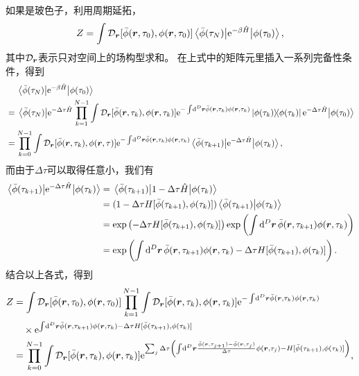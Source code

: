 \documentclass[hyperref, UTF8, a4paper]{ctexart}
\newcommand*{\ee}{\mathrm{e}}
\begin{document}
如果是玻色子，利用周期延拓，
\[
    Z = \int \mathcal{D}_{\vb*{r}}{[\bar{\phi}(\vb*{r}, \tau_0), \phi(\vb*{r}, \tau_0)]} \mel{\bar{\phi}(\tau_N)}{\ee^{- \beta \hat{H}}}{\phi(\tau_0)},
\]
其中$\mathcal{D}_{\vb*{r}}$表示只对空间上的场构型求和。
在上式中的矩阵元里插入一系列完备性条件，得到
\[
    \begin{aligned}
        &\quad \; \mel{\bar{\phi}(\tau_N)}{\ee^{- \beta \hat{H}}}{\phi(\tau_0)} \\
        &= \mel{\bar{\phi}(\tau_N)}{\ee^{-\Delta \tau \hat{H}} \prod_{k=1}^{N-1} \int \mathcal{D}_{\vb*{r}}[\bar{\phi}(\vb*{r}, \tau_k), \phi(\vb*{r}, \tau_k)] \ee^{- \int \dd[D]{\vb*{r}} \bar{\phi}(\vb*{r}, \tau_k) \phi(\vb*{r}, \tau_k) } \dyad{\phi(\tau_k)} \ee^{ - \Delta \tau \hat{H}} }{\phi(\tau_0)} \\
        &= \prod_{k=0}^{N-1} \int \mathcal{D}_{\vb*{r}}[\bar{\phi}(\vb*{r}, \tau_k), \phi(\vb*{r}, \tau)] \ee^{- \int \dd[D]{\vb*{r}} \bar{\phi}(\vb*{r}, \tau_k) \phi(\vb*{r}, \tau_k) } \mel{\bar{\phi}(\tau_{k+1})}{\ee^{ - \Delta \tau \hat{H}}}{\phi(\tau_k)},
    \end{aligned}
\]
而由于$\Delta \tau$可以取得任意小，我们有
\[
    \begin{aligned}
        \mel{\bar{\phi}(\tau_{k+1})}{\ee^{-\Delta \tau \hat{H}}}{\phi(\tau_k)} &= \mel{\bar{\phi}(\tau_{k+1})}{1 - \Delta \tau \hat{H}}{\phi(\tau_k)} \\
        &= (1 - \Delta \tau H[\bar{\phi}(\tau_{k+1}), \phi(\tau_k)]) \braket{\bar{\phi}(\tau_{k+1})}{\phi(\tau_k)} \\
        &= \exp \left( - \Delta \tau H[\bar{\phi}(\tau_{k+1}), \phi(\tau_k)] \right) \exp \left( \int \dd[D]{\vb*{r}} \bar{\phi}(\vb*{r}, \tau_{k+1}) \phi(\vb*{r}, \tau_k) \right) \\
        &= \exp \left( \int \dd[D]{\vb*{r}} \bar{\phi}(\vb*{r}, \tau_{k+1}) \phi(\vb*{r}, \tau_k) - \Delta \tau H[\bar{\phi}(\tau_{k+1}), \phi(\tau_k)] \right).
    \end{aligned}
\]
结合以上各式，得到
\[
    \begin{aligned}
        Z &= \int \mathcal{D}_{\vb*{r}}[ \bar{\phi}(\vb*{r}, \tau_0), \phi(\vb*{r}, \tau_0) ]  \prod_{k=1}^{N-1} \int \mathcal{D}_{\vb*{r}}[ \bar{\phi}(\vb*{r}, \tau_k), \phi(\vb*{r}, \tau_k) ] \ee^{- \int \dd[D]{\vb*{r}} \bar{\phi}(\vb*{r}, \tau_k) \phi(\vb*{r}, \tau_k) } \\
        & \quad \times \ee^{\int \dd[D]{\vb*{r}} \bar{\phi}(\vb*{r}, \tau_{k+1}) \phi(\vb*{r}, \tau_k) - \Delta \tau H[\bar{\phi}(\tau_{k+1}), \phi(\tau_k)]} \\
        &= \prod_{k=0}^{N-1} \int \mathcal{D}_{\vb*{r}}[ \bar{\phi}(\vb*{r}, \tau_k), \phi(\vb*{r}, \tau_k) ] \ee^{\sum_j \Delta \tau \left( \int \dd[D]{\vb*{r}} \frac{\bar{\phi}(\vb*{r}, \tau_{j+1}) - \bar{\phi}(\vb*{r}, \tau_j) }{\Delta \tau} \phi(\vb*{r}, \tau_j) - H[\bar{\phi}(\tau_{k+1}), \phi(\tau_k)] \right) },
    \end{aligned}
\]
\end{document}
